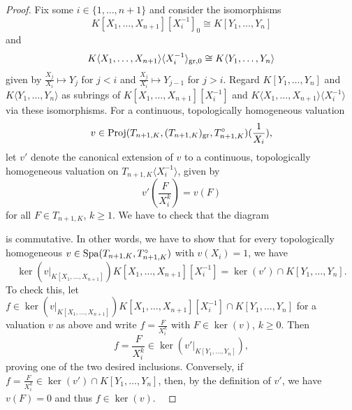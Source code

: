 \documentclass[12pt,twoside,a4paper]{article}
\theoremstyle{definition}
\theoremstyle{remark}
\newcommand\ad{{\rm ad}}
\newcommand\gr{{\rm gr}}
\newcommand\Proj{{\rm Proj}}
\newcommand\Spa{{\rm Spa}}
\newcommand\Spec{{\rm Spec}}
\begin{document}
\begin{proof}
Fix some $i\in\{1,\dots, n+1\}$ and consider the isomorphisms \begin{equation*}K[X_{1},\dots, X_{n+1}][X_{i}^{-1}]_{0}\cong K[Y_1,\dots, Y_n]\end{equation*}and \begin{equation*}K\langle X_{1},\dots, X_{n+1}\rangle\langle X_{i}^{-1}\rangle_{\gr, 0}\cong K\langle Y_{1},\dots, Y_{n}\rangle\end{equation*}given by $\frac{X_{j}}{X_{i}}\mapsto Y_{j}$ for $j<i$ and $\frac{X_{j}}{X_{i}}\mapsto Y_{j-1}$ for $j>i$. Regard $K[Y_1,\dots, Y_n]$ and $K\langle Y_1,\dots, Y_n\rangle$ as subrings of $K[X_1,\dots, X_{n+1}][X_{i}^{-1}]$ and $K\langle X_1,\dots, X_{n+1}\rangle\langle X_{i}^{-1}\rangle$ via these isomorphisms. For a continuous, topologically homogeneous valuation \begin{equation*}v\in \Proj(T_{n+1, K}, (T_{n+1, K})_{\gr}, T_{n+1, K}^{\circ})(\frac{1}{X_{i}}),\end{equation*}let $v'$ denote the canonical extension of $v$ to a continuous, topologically homogeneous valuation on $T_{n+1, K}\langle X_{i}^{-1}\rangle$, given by \begin{equation*}v'(\frac{F}{X_{i}^{k}})=v(F)\end{equation*}for all $F\in T_{n+1, K}$, $k\geq1$. We have to check that the diagram \begin{center}\end{center}is commutative. In other words, we have to show that for every topologically homogeneous $v\in \Spa(T_{n+1, K}, T_{n+1, K}^{\circ})$ with $v(X_{i})=1$, we have \begin{equation*}\ker(v\vert_{K[X_1,\dots, X_{n+1}]})K[X_1,\dots, X_{n+1}][X_{i}^{-1}]=\ker(v')\cap K[Y_1,\dots, Y_n].\end{equation*}To check this, let $f\in \ker(v\vert_{K[X_1,\dots, X_{n+1}]})K[X_1,\dots, X_{n+1}][X_{i}^{-1}]\cap K[Y_1,\dots, Y_n]$ for a valuation $v$ as above and write $f=\frac{F}{X_{i}^{k}}$ with $F\in \ker(v)$, $k\geq0$. Then \begin{equation*}f=\frac{F}{X_{i}^{k}}\in \ker(v'\vert_{K[Y_1,\dots, Y_n]}),\end{equation*}proving one of the two desired inclusions. Conversely, if $f=\frac{F}{X_{i}^{k}}\in \ker(v')\cap K[Y_1,\dots, Y_n]$, then, by the definition of $v'$, we have $v(F)=0$ and thus $f\in \ker(v)$.  \end{proof}
\end{document}
